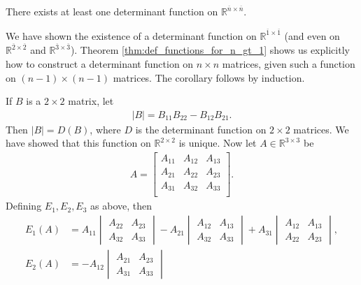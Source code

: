 \documentclass[12pt,letterpaper,reqno]{article}
\numberwithin{equation}{section}
\begin{document}
\begin{cor}
	There exists at least one determinant function on $\mathbb{R}^{\overline{n} \times \overline{n}}$.
\end{cor}

\begin{pf}
We have shown the existence of a determinant function on $\mathbb{R}^{\overline{1} \times \overline{1}}$ (and even on $\mathbb{R}^{\overline{2} \times \overline{2}}$ and $\mathbb{R}^{\overline{3} \times \overline{3}}$). Theorem \ref{thm:def_functions_for_n_gt_1} shows us explicitly how to construct a determinant function on $n \times n$ matrices, given such a function on $(n-1) \times (n-1)$ matrices. The corollary follows by induction.
\end{pf}

\begin{example}
If $B$ is a $2 \times 2$ matrix, let
\begin{align*}
	|B|=B_{11}B_{22}-B_{12}B_{21}.
\end{align*}	
Then $|B|=D(B)$, where $D$ is the determinant function on $2 \times 2$ matrices. We have showed that this function on $\mathbb{R}^{2 \times 2}$ is unique. Now let $A \in \mathbb{R}^{3 \times 3}$ be
\begin{align*}
	A=\begin{bmatrix}
		A_{11} & A_{12} & A_{13} \\
		A_{21} & A_{22} & A_{23} \\
		A_{31} & A_{32} & A_{33} \\
	\end{bmatrix}.
\end{align*}
Defining $E_1, E_2, E_3$ as above, then
\begin{align*}
	E_1(A)&=A_{11}\begin{vmatrix}
		A_{22} & A_{23} \\ A_{32} & A_{33}
	\end{vmatrix}-A_{21}\begin{vmatrix}
		A_{12} & A_{13} \\ A_{32} & A_{33}
	\end{vmatrix} + A_{31} \begin{vmatrix}
		A_{12} & A_{13} \\ A_{22} & A_{23}
	\end{vmatrix}, \\
	E_2(A)&=-A_{12}\begin{vmatrix}
		A_{21} & A_{23} \\ A_{31} & A_{33}

\end{vmatrix}
\end{align*}
\end{example}
\end{document}
